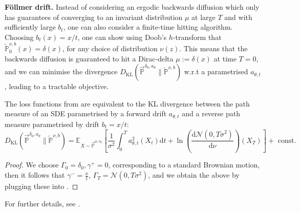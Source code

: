 \textbf{F{\"o}llmer drift.} Instead of considering an ergodic backwards diffusion which only has guarantees of converging to an invariant distribution $\mu$ at large $T$ and with sufficiently large $b_t$, one can also consider a finite-time hitting algorithm. Choosing $b_t(x) = x / t$, one can show using Doob's $h$-transform \parencite[Theorem 40.3(iii)]{rogers2000diffusions} that $\overleftarrow{\mathbb{P}}_0^{\nu, b}(x)=\delta(x)$, for any choice of distribution $\nu(z)$. This means that the backwards diffusion is guaranteed to hit a Dirac-delta $\mu := \delta(x)$ at time $T=0$, and we can minimise the divergence $D_{\mathrm{KL}}\left(\overrightarrow{\mathbb{P}}^{\delta_0, a_{\theta}} \| \overleftarrow{\mathbb{P}}^{\nu, b}\right)$ w.r.t a parametrised $a_{\theta, t}$, leading to a tractable objective. 
\begin{selfproposition}
    The loss functions from \textcite{dai1991stochastic, vargas2023bayesian, zhang2021path} are equivalent to the KL divergence between the path measure of an SDE parametrised by a forward drift $a_{\theta, t}$ and a reverse path measure parametrised by drift $b_t = x / t$:
    \[
    D_{\mathrm{KL}}\left(\overrightarrow{\mathbb{P}}^{\delta_0, a_{\theta}} \| \overleftarrow{\mathbb{P}}^{\nu, b}\right)\!=\!\mathbb{E}_{X \sim \overrightarrow{\mathbb{P}}^{\mu, a_{\theta}}}\left[\frac{1}{\sigma^2} \int_0^T \!a_{\theta, t}^2\left(X_t\right) \mathrm{d} t\!+\!\ln \!\left(\frac{\mathrm{d} \mathcal{N}\left(0, T \sigma^2\right)}{\mathrm{d} \nu}\right)\left(X_T\right)\right]\!+\!\text { const.}
    \]
    \end{selfproposition}
    \begin{proof}
        We choose $\Gamma_0=\delta_0, \gamma^{+}=0$, corresponding to a standard Brownian motion, then it follows that $\gamma^{-}=\frac{x}{t}$, $\Gamma_T=\mathcal{N}\left(0, T \sigma^2\right)$, and we obtain the above by plugging these into .
    \end{proof}
For further details, see \textcite{follmer2005entropy,vargas2023bayesian, huang2021schrodinger}.

